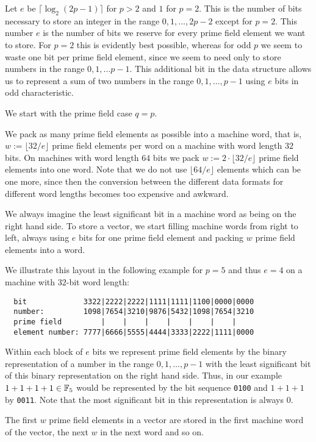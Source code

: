 Let $e$ be $\lceil \log_2(2p-1)\rceil$ for $p > 2$ and $1$ for $p=2$. 
This is the number of bits
necessary to store an integer in the range $0,1, \ldots, 2p-2$ except
for $p=2$. This number $e$ is the number of bits we 
reserve for every prime field element we want to store. For $p=2$ this
is evidently best possible, whereas for odd $p$ we seem to waste
one bit per prime field element, since we seem to need only to store
numbers in the range $0,1,\ldots p-1$. This additional bit in the
data structure allows us to represent a sum of two numbers in the
range $0,1,\ldots, p-1$ using $e$ bits in odd characteristic.

We start with the prime field case $q=p$.

We pack as many prime field elements as possible into a machine
word, that is, $w := \lfloor 32/e \rfloor$ prime field elements per word
on a machine with word length $32$ bits. On machines with word length $64$ bits
we pack $w := 2 \cdot \lfloor 32/e \rfloor$ prime field elements into one word.
Note that we do not use $\lfloor 64/e \rfloor$ elements which can be one
more, since then the conversion between the different data formats for
different word lengths becomes too expensive and awkward.

We always imagine the least significant bit in a machine word as being 
on the right hand side. To store a vector, we start filling machine words 
from right to left, always using $e$ bits for one prime field element and
packing $w$ prime field elements into a word.

We illustrate this layout in the following example for $p=5$ and thus
$e=4$ on a machine with $32$-bit word length:

\begin{verbatim}
  bit             3322|2222|2222|1111|1111|1100|0000|0000
  number:         1098|7654|3210|9876|5432|1098|7654|3210
  prime field         |    |    |    |    |    |    |
  element number: 7777|6666|5555|4444|3333|2222|1111|0000
\end{verbatim}

Within each block of $e$ bits we represent prime field elements
by the binary representation of a number in the range $0,1,\ldots,p-1$
with the least significant bit of this binary representation on the
right hand side. Thus, in our example $1+1+1+1 \in \mathbb{F}_5$ would be
represented by the bit sequence \texttt{0100} and $1+1+1$ by \texttt{0011}.
Note that the most significant bit in this representation is always $0$.

The first $w$ prime field elements in a vector are stored in the first
machine word of the vector, the next $w$ in the next word and so on.

